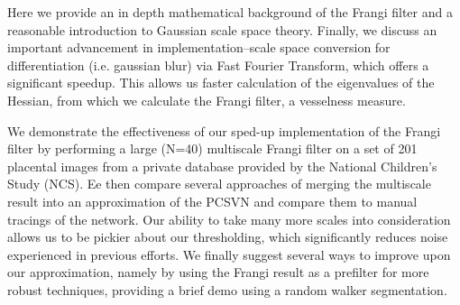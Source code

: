 Here we provide an in depth mathematical background of the Frangi filter and a reasonable introduction to Gaussian scale space theory. Finally, we discuss an important advancement in implementation--scale space conversion for differentiation (i.e. gaussian blur) via Fast Fourier Transform, which offers a significant speedup. This allows us faster calculation of the eigenvalues of the Hessian, from which we calculate the Frangi filter, a vesselness measure.

We demonstrate the effectiveness of our sped-up implementation of the Frangi filter by performing a large (N=40) multiscale Frangi filter on a set of 201 placental images from a private database provided by the National Children's Study (NCS). Ee then compare several approaches of merging the multiscale result into an approximation of the PCSVN and compare them to manual tracings of the network. Our ability to take many more scales into consideration allows us to be pickier about our thresholding, which significantly reduces noise experienced in previous efforts. We finally suggest several ways to improve upon our approximation, namely by using the Frangi result as a prefilter for more robust techniques, providing a brief demo using a random walker segmentation.